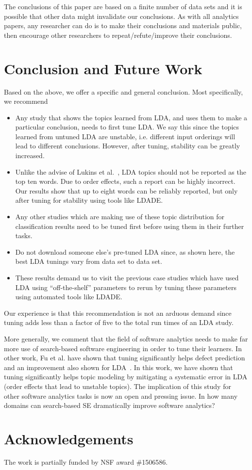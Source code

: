 \documentclass[twocolumn,5p,sort&compress]{elsarticle}
\newcommand{\bi}{\begin{itemize}}
\newcommand{\ei}{\end{itemize}}
\theoremstyle{break}
\begin{document}
The conclusions of this paper are based on a finite number of data sets and it is possible
that other data might invalidate our conclusions. As with all analytics papers, any researcher can do is to make their conclusions and materials public, then encourage
other researchers to repeat/refute/improve their conclusions.

\section{Conclusion and Future Work}

Based on the above, we offer a specific and general conclusion. Most specifically, we recommend 
\bi

\item  
Any study that shows the topics learned from LDA, and uses them to make a particular
conclusion, needs to first tune LDA. We say this since the topics learned from untuned LDA are unstable, i.e. different input orderings will lead to different conclusions. However, after tuning, stability can be greatly increased.
\item Unlike the advise of Lukins et al.~\cite{lukins2010bug}, LDA topics should not be reported as the top ten words.
  Due to order effects, such a report can be highly incorrect.
  Our results show that up to eight words can be reliably reported, but only
  after tuning for stability using tools like LDADE.
 \item Any other studies which are making use of these topic distribution for classification results need to be tuned first before using them in their further tasks.
\item Do not download someone else's pre-tuned LDA since, as shown here,  the best LDA tunings vary from data set to data set.
\item These results demand us to visit the previous case studies which have used LDA using ``off-the-shelf'' parameters to rerun by tuning these parameters using automated tools like LDADE.
    
\ei
Our experience is that this recommendation is not an arduous demand since tuning adds less than a factor of five to the total run times of an LDA study.

More generally, we comment that the field of software analytics needs to make far more use of search-based software engineering in order
to tune their learners. In other work, Fu et al. have shown that tuning significantly helps defect prediction~\cite{fu2016tuning} and an improvement also shown for LDA~\cite{panichella2013effectively}. In this work, we have shown that tuning significantly helps topic modeling by mitigating a systematic error in LDA  (order effects that lead to unstable topics). The implication of this study for other software analytics tasks is now an open
and pressing issue. 
In how many domains can search-based SE dramatically improve software analytics?


\section*{Acknowledgements}
		The work is partially funded by NSF award \#1506586.
	


\medskip

\end{document}
